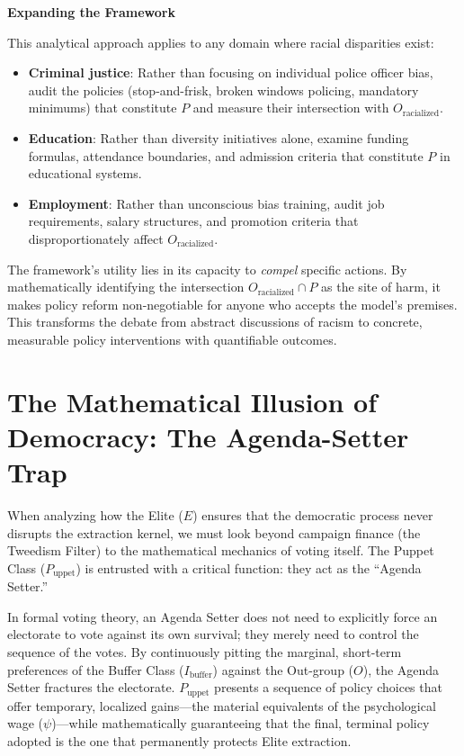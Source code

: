 \documentclass[12pt,openany]{book}
\begin{document}
\textbf{Expanding the Framework}

This analytical approach applies to any domain where racial disparities exist:
\begin{itemize}
    \item \textbf{Criminal justice}: Rather than focusing on individual police officer bias, audit the policies (stop-and-frisk, broken windows policing, mandatory minimums) that constitute $P$ and measure their intersection with $O_{\text{racialized}}$.
    \item \textbf{Education}: Rather than diversity initiatives alone, examine funding formulas, attendance boundaries, and admission criteria that constitute $P$ in educational systems.
    \item \textbf{Employment}: Rather than unconscious bias training, audit job requirements, salary structures, and promotion criteria that disproportionately affect $O_{\text{racialized}}$.
\end{itemize}

The framework's utility lies in its capacity to \textit{compel} specific actions. By mathematically identifying the intersection $O_{\text{racialized}} \cap P$ as the site of harm, it makes policy reform non-negotiable for anyone who accepts the model's premises. This transforms the debate from abstract discussions of racism to concrete, measurable policy interventions with quantifiable outcomes.

\section{The Mathematical Illusion of Democracy: The Agenda-Setter Trap}

When analyzing how the Elite ($E$) ensures that the democratic process never disrupts the extraction kernel, we must look beyond campaign finance (the Tweedism Filter) to the mathematical mechanics of voting itself. The Puppet Class ($P_{\text{uppet}}$) is entrusted with a critical function: they act as the ``Agenda Setter.''

In formal voting theory, an Agenda Setter does not need to explicitly force an electorate to vote against its own survival; they merely need to control the sequence of the votes. By continuously pitting the marginal, short-term preferences of the Buffer Class ($I_{\text{buffer}}$) against the Out-group ($O$), the Agenda Setter fractures the electorate. $P_{\text{uppet}}$ presents a sequence of policy choices that offer temporary, localized gains---the material equivalents of the psychological wage ($\psi$)---while mathematically guaranteeing that the final, terminal policy adopted is the one that permanently protects Elite extraction.
\end{document}
